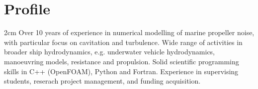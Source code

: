 \documentclass[a4paper,10pt]{article}
\begin{document}
\pagestyle{empty} %

\par{\par\par}

\section{Profile}

\hspace{1cm}
\begin{minipage}{\textwidth}
\begin{adjustwidth}{}{2cm} %
	Over 10 years of experience in numerical modelling of marine propeller noise, with particular focus on cavitation and turbulence. Wide range of activities in broader ship hydrodynamics, e.g. underwater vehicle hydrodynamics, manoeuvring models, resistance and propulsion. Solid scientific programming skills in C++ (OpenFOAM), Python and Fortran. Experience in supervising students, reserach project management, and funding acquisition.
\end{adjustwidth}
\end{minipage}

%
%
%

\end{document}
